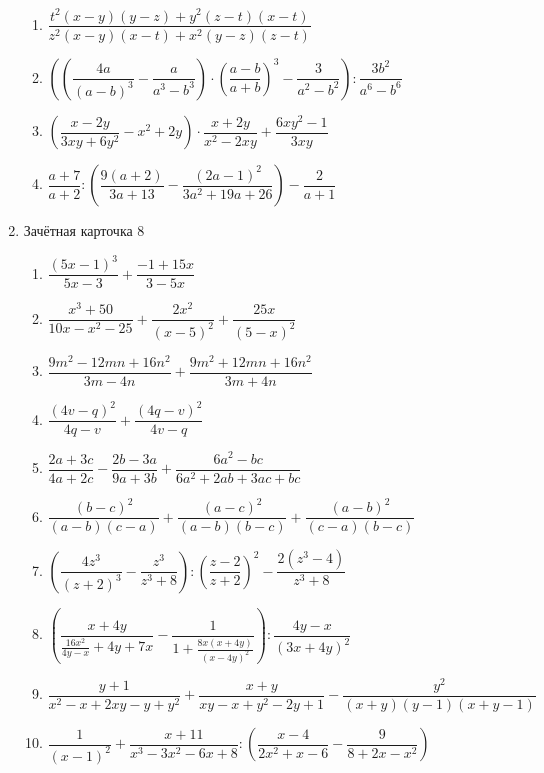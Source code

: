 \documentclass[12pt, a4paper]{article}
\begin{document}
\begin{enumerate}
\begin{enumerate}[label=\asbuk*)]
		\item \( \dfrac{t^2(x-y)(y-z)+y^2(z-t)(x-t)}{z^2(x-y)(x-t)+x^2(y-z)(z-t)} \)
		\item \( \left( \left( \dfrac{4a}{(a-b)^3} -\dfrac{a}{a^3-b^3}\right)\cdot\left( \dfrac{a-b}{a+b} \right)^3-\dfrac{3}{a^2-b^2} \right):\dfrac{3b^2}{a^6-b^6} \)
		\item \( \left( \dfrac{x-2y}{3xy+6y^2}-x^2+2y \right) \cdot\dfrac{x+2y}{x^2-2xy}+\dfrac{6xy^2-1}{3xy}\)
		\item \( \dfrac{a+7}{a+2}:\left( \dfrac{9(a+2)}{3a+13}-\dfrac{(2a-1)^2}{3a^2+19a+26} \right) -\dfrac{2}{a+1}\)
		\end{enumerate}
	\item Зачётная карточка 8
	\begin{enumerate}[label=\asbuk*)]
		\item \( \dfrac{(5x-1)^3}{5x-3}+\dfrac{-1+15x}{3-5x} \)
		\item \( \dfrac{x^3+50}{10x-x^2-25}+\dfrac{2x^2}{(x-5)^2}+\dfrac{25x}{(5-x)^2} \)
		\item \( \dfrac{9m^2-12mn+16n^2}{3m-4n}+\dfrac{9m^2+12mn+16n^2}{3m+4n} \)
		\item \( \dfrac{(4v-q)^2}{4q-v}+\dfrac{(4q-v)^2}{4v-q} \)
		\item \( \dfrac{2a+3c}{4a+2c}-\dfrac{2b-3a}{9a+3b}+\dfrac{6a^2-bc}{6a^2+2ab+3ac+bc} \)
		\item \( \dfrac{(b-c)^2}{(a-b)(c-a)}+\dfrac{(a-c)^2}{(a-b)(b-c)}+\dfrac{(a-b)^2}{(c-a)(b-c)} \)
		\item \( \left( \dfrac{4z^3}{(z+2)^3}-\dfrac{z^3}{z^3+8} \right) :\left( \dfrac{z-2}{z+2} \right)^2-\dfrac{2(z^3-4)}{z^3+8}\)
		\item \( \left( \dfrac{x+4y}{\frac{16x^2}{4y-x}+4y+7x} -\dfrac{1}{1+\frac{8x(x+4y)}{(x-4y)^2}}\right):\dfrac{4y-x}{(3x+4y)^2} \)
		\item \( \dfrac{y+1}{x^2-x+2xy-y+y^2}+\dfrac{x+y}{xy-x+y^2-2y+1}-\dfrac{y^2}{(x+y)(y-1)(x+y-1)} \)
		\item \( \dfrac{1}{(x-1)^2}+\dfrac{x+11}{x^3-3x^2-6x+8}:\left( \dfrac{x-4}{2x^2+x-6}-\dfrac{9}{8+2x-x^2} \right) \)
	\end{enumerate}
\end{enumerate}
\end{document}
